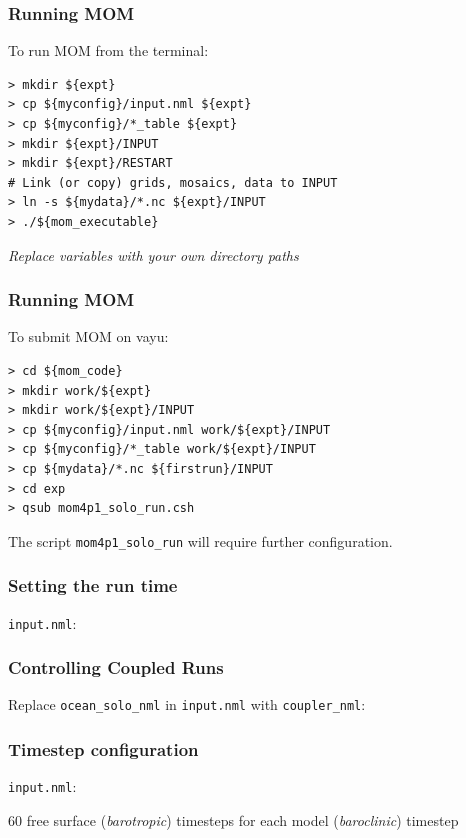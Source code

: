 \documentclass{beamer}
\begin{document}
\begin{frame}[fragile]
    \frametitle{Running MOM}
    
    To run MOM from the terminal:
    \begin{lstlisting}
> mkdir ${expt}
> cp ${myconfig}/input.nml ${expt}
> cp ${myconfig}/*_table ${expt}
> mkdir ${expt}/INPUT
> mkdir ${expt}/RESTART
# Link (or copy) grids, mosaics, data to INPUT
> ln -s ${mydata}/*.nc ${expt}/INPUT
> ./${mom_executable}
    \end{lstlisting}
    \textit{Replace variables with your own directory paths}

\end{frame}

\begin{frame}[fragile]
    \frametitle{Running MOM}
    
    To submit MOM on vayu:
    \begin{lstlisting}
> cd ${mom_code}
> mkdir work/${expt}
> mkdir work/${expt}/INPUT
> cp ${myconfig}/input.nml work/${expt}/INPUT
> cp ${myconfig}/*_table work/${expt}/INPUT
> cp ${mydata}/*.nc ${firstrun}/INPUT
> cd exp
> qsub mom4p1_solo_run.csh
    \end{lstlisting}
The script \lstinline|mom4p1_solo_run| will require further configuration.

\end{frame}

\begin{frame}[fragile]
    \frametitle{Setting the run time}
   
    \lstinline|input.nml|:
    
\end{frame}

\begin{frame}
    \frametitle{Controlling Coupled Runs}

    Replace \lstinline|ocean_solo_nml| in \lstinline|input.nml| with
    \lstinline|coupler_nml|:
    
\end{frame}

\begin{frame}[fragile]
    \frametitle{Timestep configuration}
   
    \lstinline|input.nml|:
    
    60 free surface (\textit{barotropic}) timesteps for each model
    (\textit{baroclinic}) timestep
\end{frame}
\end{document}
